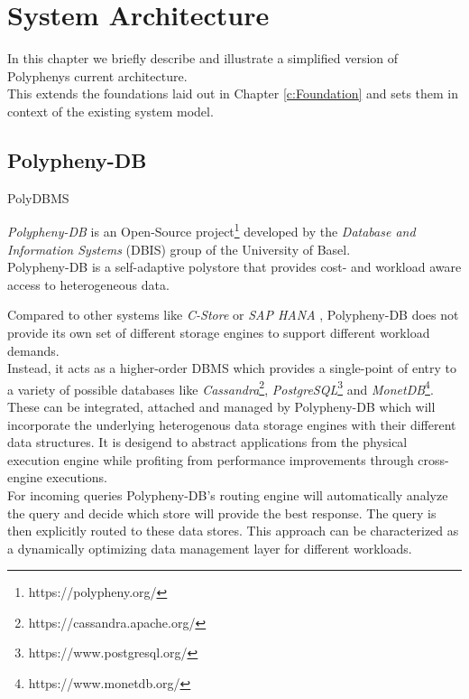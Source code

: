 \chapter{System Architecture}
\label{c:architecture}

In this chapter we briefly describe and illustrate a simplified version of Polyphenys current architecture.\\
This extends the foundations laid out in Chapter \ref{c:Foundation} and sets them in context of the existing system model.






\section{Polypheny-DB}
PolyDBMS \cite{polypheny2021}

\textit{Polypheny-DB} is an Open-Source project\footnote{https://polypheny.org/} developed by 
the \textit{Database and Information Systems} (DBIS) group of the University of Basel.\\

Polypheny-DB is a self-adaptive polystore that provides cost- and workload aware access to heterogeneous data\cite{poly2020}.

Compared to other systems like \textit{C-Store}\cite{cstore_2005} or \textit{SAP HANA} \cite{hana_2012}, 
Polypheny-DB does not provide its own set of different storage engines to support 
different workload demands.\\
Instead, it acts as a higher-order DBMS which provides a single-point of entry to 
a variety of possible databases like 
\textit{Cassandra}\footnote{https://cassandra.apache.org/}, 
\textit{PostgreSQL}\footnote{https://www.postgresql.org/} 
and \textit{MonetDB}\footnote{https://www.monetdb.org/}. 
These can be integrated, attached and managed by Polypheny-DB which will incorporate the underlying 
heterogenous data storage engines with their different data structures. It is 
desigend to abstract applications from the physical execution engine while profiting from 
performance improvements through cross-engine executions. 
\\
For incoming queries Polypheny-DB's routing engine will automatically analyze the query and decide 
which store will provide the best response. The query is then explicitly routed to these data stores. 
This approach can be characterized as a dynamically optimizing data management layer for different workloads.


